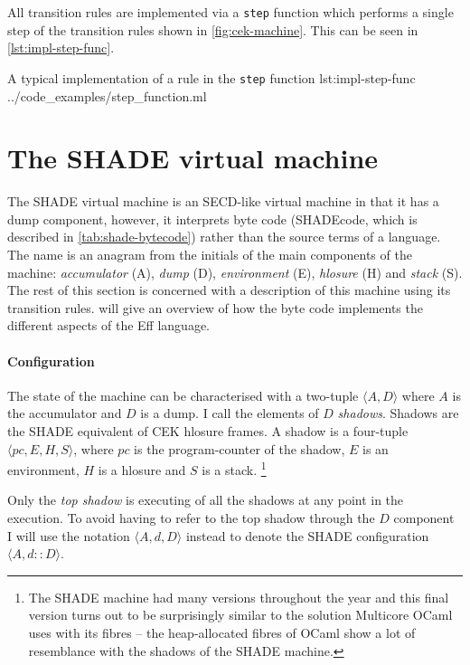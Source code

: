 \documentclass[class=article, crop=false]{standalone}
\begin{document}
All transition rules are implemented via a \lstinline{step} function which
performs a single step of the transition rules shown in
\autoref{fig:cek-machine}. This can be seen in \autoref{lst:impl-step-func}.

{A typical implementation of a rule in the \lstinline{step} function}
{lst:impl-step-func}
{../code_examples/step_function.ml}

\section{The SHADE virtual machine}
\label{sec:shade-machine}

The SHADE virtual machine is an SECD-like virtual machine in that it has a dump
component, however, it interprets byte code (SHADEcode, which is described in
\autoref{tab:shade-bytecode}) rather than the source terms of a language. The
name is an anagram from the initials of the main components of the machine: 
\emph{accumulator} (A), \emph{dump} (D), \emph{environment} (E),
\emph{hlosure} (H) and \emph{stack} (S). The rest of this section is concerned
with a description of this machine using its transition rules.
 will give an overview of how the byte code
implements the different aspects of the Eff language.

\paragraph{Configuration}
The state of the machine can be characterised with a two-tuple
$\langle A, D \rangle$ where $A$ is the accumulator and $D$ is a dump. I call
the elements of $D$ \emph{shadows}. Shadows are the SHADE equivalent of CEK
hlosure frames. A shadow is a four-tuple $\langle pc, E, H, S \rangle$, where
$pc$ is the program-counter of the shadow, $E$ is an environment, $H$ is a
hlosure and $S$ is a stack.
\footnote{The SHADE machine had many versions throughout the year and this
final version turns out to be surprisingly similar to the solution Multicore
OCaml uses with its fibres -- the heap-allocated fibres of OCaml show a lot
of resemblance with the shadows of the SHADE machine.}

Only the \emph{top shadow} is executing of all the shadows at any point in the
execution. To avoid having to refer to the top shadow through the $D$ component
I will use the notation $\langle A, d, D \rangle$ instead to denote the SHADE
configuration $\langle A, d :: D \rangle$.
\end{document}

